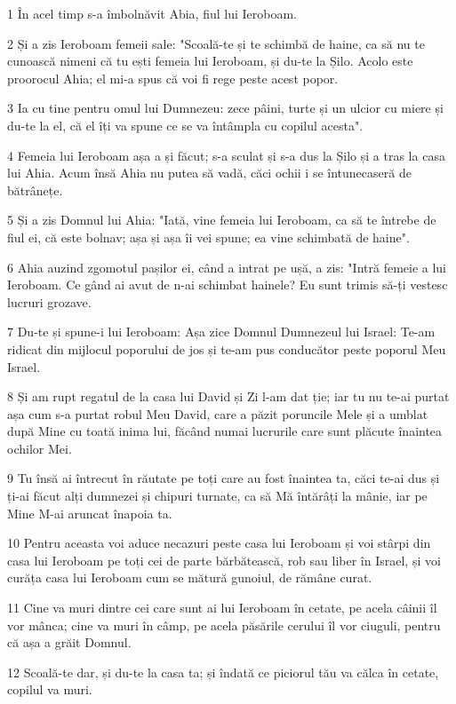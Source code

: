 \par 1 În acel timp s-a îmbolnăvit Abia, fiul lui Ieroboam.
\par 2 Și a zis Ieroboam femeii sale: "Scoală-te și te schimbă de haine, ca să nu te cunoască nimeni că tu ești femeia lui Ieroboam, și du-te la Șilo. Acolo este proorocul Ahia; el mi-a spus că voi fi rege peste acest popor.
\par 3 Ia cu tine pentru omul lui Dumnezeu: zece pâini, turte și un ulcior cu miere și du-te la el, că el îți va spune ce se va întâmpla cu copilul acesta".
\par 4 Femeia lui Ieroboam așa a și făcut; s-a sculat și s-a dus la Șilo și a tras la casa lui Ahia. Acum însă Ahia nu putea să vadă, căci ochii i se întunecaseră de bătrânețe.
\par 5 Și a zis Domnul lui Ahia: "Iată, vine femeia lui Ieroboam, ca să te întrebe de fiul ei, că este bolnav; așa și așa îi vei spune; ea vine schimbată de haine".
\par 6 Ahia auzind zgomotul pașilor ei, când a intrat pe ușă, a zis: "Intră femeie a lui Ieroboam. Ce gând ai avut de n-ai schimbat hainele? Eu sunt trimis să-ți vestesc lucruri grozave.
\par 7 Du-te și spune-i lui Ieroboam: Așa zice Domnul Dumnezeul lui Israel: Te-am ridicat din mijlocul poporului de jos și te-am pus conducător peste poporul Meu Israel.
\par 8 Și am rupt regatul de la casa lui David și Zi l-am dat ție; iar tu nu te-ai purtat așa cum s-a purtat robul Meu David, care a păzit poruncile Mele și a umblat după Mine cu toată inima lui, făcând numai lucrurile care sunt plăcute înaintea ochilor Mei.
\par 9 Tu însă ai întrecut în răutate pe toți care au fost înaintea ta, căci te-ai dus și ți-ai făcut alți dumnezei și chipuri turnate, ca să Mă întărâți la mânie, iar pe Mine M-ai aruncat înapoia ta.
\par 10 Pentru aceasta voi aduce necazuri peste casa lui Ieroboam și voi stârpi din casa lui Ieroboam pe toți cei de parte bărbătească, rob sau liber în Israel, și voi curăța casa lui Ieroboam cum se mătură gunoiul, de rămâne curat.
\par 11 Cine va muri dintre cei care sunt ai lui Ieroboam în cetate, pe acela câinii îl vor mânca; cine va muri în câmp, pe acela păsările cerului îl vor ciuguli, pentru că așa a grăit Domnul.
\par 12 Scoală-te dar, și du-te la casa ta; și îndată ce piciorul tău va călca în cetate, copilul va muri.
